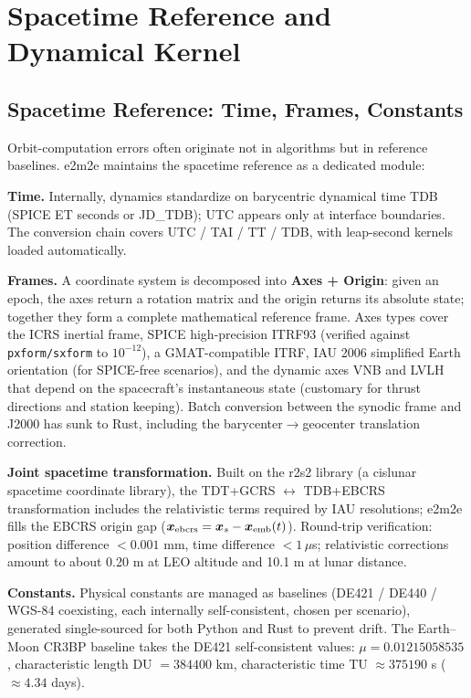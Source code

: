 \section{Spacetime Reference and Dynamical Kernel}
\label{sec:dynamics}

\subsection{Spacetime Reference: Time, Frames, Constants}

Orbit-computation errors often originate not in algorithms but in reference
baselines. e2m2e maintains the spacetime reference as a dedicated module:

\textbf{Time.} Internally, dynamics standardize on barycentric dynamical time
TDB (SPICE ET seconds or JD\_TDB); UTC appears only at interface boundaries.
The conversion chain covers UTC / TAI / TT / TDB, with leap-second kernels
loaded automatically.

\textbf{Frames.} A coordinate system is decomposed into \textbf{Axes +
Origin}: given an epoch, the axes return a rotation matrix and the origin
returns its absolute state; together they form a complete mathematical
reference frame. Axes types cover the ICRS inertial frame, SPICE
high-precision ITRF93 (verified against \texttt{pxform/sxform} to
$10^{-12}$), a GMAT-compatible ITRF, IAU 2006 simplified Earth orientation
(for SPICE-free scenarios), and the dynamic axes VNB and LVLH that depend on
the spacecraft's instantaneous state (customary for thrust directions and
station keeping). Batch conversion between the synodic frame and J2000 has
sunk to Rust, including the barycenter$\to$geocenter translation correction.

\textbf{Joint spacetime transformation.} Built on the r2s2 library (a
cislunar spacetime coordinate library), the TDT+GCRS $\leftrightarrow$
TDB+EBCRS transformation includes the relativistic terms required by IAU
resolutions; e2m2e fills the EBCRS origin gap ($\bm{x}_{\mathrm{ebcrs}} =
\bm{x}_s - \bm{x}_{\mathrm{emb}}(t)$). Round-trip verification: position
difference $< 0.001$ mm, time difference $< 1\,\mu$s; relativistic
corrections amount to about 0.20 m at LEO altitude and 10.1 m at lunar
distance.

\textbf{Constants.} Physical constants are managed as baselines (DE421 /
DE440 / WGS-84 coexisting, each internally self-consistent, chosen per
scenario), generated single-sourced for both Python and Rust to prevent
drift. The Earth--Moon CR3BP baseline takes the DE421 self-consistent values:
$\mu = 0.01215058535$, characteristic length DU $= 384400$ km, characteristic
time TU $\approx 375190$ s ($\approx 4.34$ days).

